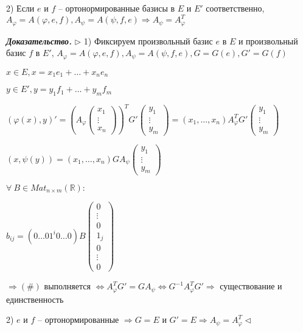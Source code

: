 2) Если $e$ и $f$ -- ортонормированные базисы в $E$ и $E'$ соответственно, $A_{\varphi} = A(\varphi, e, f), A_{\psi} = A(\psi, f, e) \Rightarrow A_{\psi} = A_{\varphi}^T$

\vspace{\baselineskip}
\textbf{\textit{Доказательство.}} $\rhd$ 1) Фиксируем произвольный базис $e$ в $E$ и произвольный базис $f$ в $E'$, $A_{\varphi} = A(\varphi, e, f), A_{\psi} = A(\psi, f, e), G = G(e), G' = G(f)$

$x \in E, x = x_1 e_1 + \dots + x_n e_n$

$y \in E', y = y_1 f_1 + \dots + y_m f_m$

$(\varphi(x), y)' = \left(A_{\varphi} \begin{pmatrix} x_1 \\ \vdots \\ x_n \end{pmatrix} \right)^T G' \begin{pmatrix} y_1 \\ \vdots \\ y_m \end{pmatrix} = (x_1, \dots, x_n) A_{\varphi}^T G' \begin{pmatrix} y_1 \\ \vdots \\ y_m \end{pmatrix}$

$(x, \psi(y)) = (x_1, \dots, x_n) G A_{\psi} \begin{pmatrix} y_1 \\ \vdots \\ y_m \end{pmatrix}$

$\forall \ B \in Mat_{n \times m} (\mathbb{R}):$

$b_{ij} = (0 \dots 01^i0 \dots 0) B \begin{pmatrix} 0 \\ \vdots \\ 0 \\ 1_j \\ 0 \\ \vdots \\ 0 \end{pmatrix}$

$\Rightarrow (\#)$ выполняется $\Leftrightarrow A_{\varphi}^T G' = G A_{\psi} \Leftrightarrow G^{-1} A_{\varphi}^T G' \Rightarrow$ существование и единственность

2) $e$ и $f$ -- ортонормированные $\Rightarrow G = E$ и $G' = E \Rightarrow A_{\psi} = A_{\varphi}^T \lhd$

